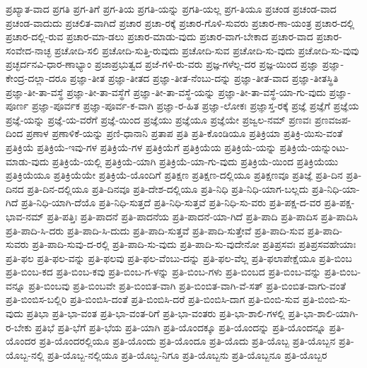 {ಪ್ರಖ್ಯಾತ-ವಾದ
ಪ್ರಗತಿ
ಪ್ರಗ-ತಿಗೆ
ಪ್ರಗ-ತಿಯ
ಪ್ರಗತಿ-ಯನ್ನು
ಪ್ರಗತಿ-ಯಲ್ಲ
ಪ್ರಗ-ತಿಯೂ
ಪ್ರಚಂಡ
ಪ್ರಚಂಡ-ವಾದ
ಪ್ರಚಂಡ-ವಾದುದು
ಪ್ರಚಲಿತ-ವಾಗಿದೆ
ಪ್ರಚಾರ
ಪ್ರಚಾ-ರಕ್ಕೆ
ಪ್ರಚಾರ-ಗೊಳಿ-ಸುವರು
ಪ್ರಚಾರ-ಣಾ-ಯಂತ್ರ
ಪ್ರಚಾರ-ದಲ್ಲಿ
ಪ್ರಚಾರ-ದಲ್ಲಿ-ರುವ
ಪ್ರಚಾರ-ಮಾ-ಡಲು
ಪ್ರಚಾರ-ಮಾಡು-ವುದು
ಪ್ರಚಾರ-ವಾಗ-ಬೇಕಾದ
ಪ್ರಚಾರ-ವಾದ
ಪ್ರಚಾರ-ಸಂವೇದ-ನಾಚ್ಛ
ಪ್ರಚೋದಿ-ಸಲಿ
ಪ್ರಚೋದಿ-ಸುತ್ತಿ-ರುವುದು
ಪ್ರಚೋದಿ-ಸುವ
ಪ್ರಚೋದಿ-ಸು-ವುದು
ಪ್ರಚೋದಿ-ಸು-ವುವು
ಪ್ರಚ್ಛರ್ದನವಿ-ಧಾರ-ಣಾಭ್ಯಾಂ
ಪ್ರಜಾಪ್ರಭುತ್ವದ
ಪ್ರಜೆ-ಗಳಿ-ರು-ವರು
ಪ್ರಜ್ಞ-ಗಳೆಲ್ಲ-ದರ
ಪ್ರಜ್ಞ-ಯಿಂದ
ಪ್ರಜ್ಞಾ
ಪ್ರಜ್ಞಾ-ಕೇಂದ್ರ-ದಲ್ಲಾ-ದರೂ
ಪ್ರಜ್ಞಾ-ತೀತ
ಪ್ರಜ್ಞಾ-ತೀತದ
ಪ್ರಜ್ಞಾ-ತೀತ-ನೆಂಬು-ದನ್ನು
ಪ್ರಜ್ಞಾ-ತೀತ-ವಾದ
ಪ್ರಜ್ಞಾ-ತೀತಸ್ಥಿತಿ
ಪ್ರಜ್ಞಾ-ತೀ-ತಾ-ವಸ್ಥೆ
ಪ್ರಜ್ಞಾ-ತೀ-ತಾ-ವಸ್ಥೆಗೆ
ಪ್ರಜ್ಞಾ-ತೀ-ತಾ-ವಸ್ಥೆ-ಯನ್ನು
ಪ್ರಜ್ಞಾ-ತೀ-ತಾ-ವಸ್ಥೆ-ಯಾ-ಗು-ವುದು
ಪ್ರಜ್ಞಾ-ಪೂರ್ಣ
ಪ್ರಜ್ಞಾ-ಪೂರ್ವಕ
ಪ್ರಜ್ಞಾ-ಪೂರ್ವ-ಕ-ವಾಗಿ
ಪ್ರಜ್ಞಾ-ರ-ಹಿತ
ಪ್ರಜ್ಞಾ-ಲೋಕಃ
ಪ್ರಜ್ಞಾಸ್ತ-ರಕ್ಕೆ
ಪ್ರಜ್ಞೆ
ಪ್ರಜ್ಞೆಗೆ
ಪ್ರಜ್ಞೆಯ
ಪ್ರಜ್ಞೆ-ಯನ್ನು
ಪ್ರಜ್ಞೆ-ಯ-ವರೆಗೆ
ಪ್ರಜ್ಞೆ-ಯಿಂದ
ಪ್ರಜ್ಞೆಯು
ಪ್ರಜ್ಞೆಯೂ
ಪ್ರಜ್ಞೆಯೇ
ಪ್ರಜ್ವಲ-ನಮ್
ಪ್ರಣವಃ
ಪ್ರಣವಜಪ-ದಿಂದ
ಪ್ರಣಾಳ
ಪ್ರಣಾಳಿಕೆ-ಯನ್ನು
ಪ್ರಣಿ-ಧಾನಾನಿ
ಪ್ರತಾಪ
ಪ್ರತಿ
ಪ್ರತಿ-ಕೊಂಡಿಯೂ
ಪ್ರತಿಕ್ರಿಯಾ
ಪ್ರತಿಕ್ರಿ-ಯಿಸು-ವಂತೆ
ಪ್ರತಿಕ್ರಿಯೆ
ಪ್ರತಿಕ್ರಿಯೆ-ಇವು-ಗಳ
ಪ್ರತಿಕ್ರಿಯೆ-ಗಳ
ಪ್ರತಿಕ್ರಿಯೆಗೆ
ಪ್ರತಿಕ್ರಿಯೆಯ
ಪ್ರತಿಕ್ರಿಯೆ-ಯನ್ನು
ಪ್ರತಿಕ್ರಿಯೆ-ಯನ್ನುಂಟು-ಮಾಡು-ವುದು
ಪ್ರತಿಕ್ರಿಯೆ-ಯಲ್ಲಿ
ಪ್ರತಿಕ್ರಿಯೆ-ಯಾಗಿ
ಪ್ರತಿಕ್ರಿಯೆ-ಯಾ-ಗು-ವುದು
ಪ್ರತಿಕ್ರಿಯೆ-ಯಿಂದ
ಪ್ರತಿಕ್ರಿಯೆಯು
ಪ್ರತಿಕ್ರಿಯೆಯೂ
ಪ್ರತಿಕ್ರಿಯೆಯೇ
ಪ್ರತಿಕ್ರಿಯೆ-ಯೊಂದಿಗೆ
ಪ್ರತಿಕ್ಷಣ
ಪ್ರತಿಕ್ಷಣ-ದಲ್ಲಿಯೂ
ಪ್ರತಿಕ್ಷಣವೂ
ಪ್ರತಿಜ್ಞೆ
ಪ್ರತಿ-ದಿನ
ಪ್ರತಿ-ದಿನದ
ಪ್ರತಿ-ದಿನ-ದಲ್ಲಿಯೂ
ಪ್ರತಿ-ದಿನವೂ
ಪ್ರತಿ-ದೇಶ-ದಲ್ಲಿಯೂ
ಪ್ರತಿ-ನಿಧಿ
ಪ್ರತಿ-ನಿಧಿ-ಯಾಗ-ಬಲ್ಲದು
ಪ್ರತಿ-ನಿಧಿ-ಯಾ-ಗಿದೆ
ಪ್ರತಿ-ನಿಧಿ-ಯಾಗಿ-ದೆಯೊ
ಪ್ರತಿ-ನಿಧಿ-ಸುತ್ತದೆ
ಪ್ರತಿ-ನಿಧಿ-ಸುತ್ತವೆ
ಪ್ರತಿ-ನಿಧಿ-ಸು-ವರು
ಪ್ರತಿ-ಪಕ್ಷ-ದ-ವರ
ಪ್ರತಿ-ಪಕ್ಷ-ಭಾವ-ನಮ್
ಪ್ರತಿ-ಪತ್ತಿಃ
ಪ್ರತಿ-ಪಾದನೆ
ಪ್ರತಿ-ಪಾದನೆಯ
ಪ್ರತಿ-ಪಾದನೆ-ಯಾ-ಗಿದೆ
ಪ್ರತಿ-ಪಾದಿ
ಪ್ರತಿ-ಪಾದಿಸ
ಪ್ರತಿ-ಪಾದಿಸಿ
ಪ್ರತಿ-ಪಾದಿ-ಸಿ-ದರು
ಪ್ರತಿ-ಪಾದಿ-ಸಿ-ದುದು
ಪ್ರತಿ-ಪಾದಿ-ಸುತ್ತವೆ
ಪ್ರತಿ-ಪಾದಿ-ಸುತ್ತೇವೆ
ಪ್ರತಿ-ಪಾದಿ-ಸುವ
ಪ್ರತಿ-ಪಾದಿ-ಸುವರು
ಪ್ರತಿ-ಪಾದಿ-ಸುವು-ದ-ರಲ್ಲಿ
ಪ್ರತಿ-ಪಾದಿ-ಸು-ವುದು
ಪ್ರತಿ-ಪಾದಿ-ಸು-ವುದೇನೋ
ಪ್ರತಿಪ್ರಸವಃ
ಪ್ರತಿಪ್ರಸವಹೇಯಾಃ
ಪ್ರತಿ-ಫಲ
ಪ್ರತಿ-ಫಲ-ವನ್ನು
ಪ್ರತಿ-ಫಲವು
ಪ್ರತಿ-ಫಲ-ವೆಂಬು-ದನ್ನು
ಪ್ರತಿ-ಫಲ-ವೆಲ್ಲ
ಪ್ರತಿ-ಫಲಾಪೇಕ್ಷೆಯೂ
ಪ್ರತಿ-ಬಿಂಬ
ಪ್ರತಿ-ಬಿಂಬ-ಕದ
ಪ್ರತಿ-ಬಿಂಬ-ಕವು
ಪ್ರತಿ-ಬಿಂಬ-ಗ-ಳನ್ನು
ಪ್ರತಿ-ಬಿಂಬ-ಗಳು
ಪ್ರತಿ-ಬಿಂಬದ
ಪ್ರತಿ-ಬಿಂಬ-ವನ್ನು
ಪ್ರತಿ-ಬಿಂಬ-ವನ್ನೂ
ಪ್ರತಿ-ಬಿಂಬವು
ಪ್ರತಿ-ಬಿಂಬವೇ
ಪ್ರತಿ-ಬಿಂಬಿತ-ವಾಗಿ
ಪ್ರತಿ-ಬಿಂಬಿತ-ವಾಗಿ-ವೆ-ಸತ್
ಪ್ರತಿ-ಬಿಂಬಿತ-ವಾಗು-ವಂತೆ
ಪ್ರತಿ-ಬಿಂಬಿಸ-ಬಲ್ಲಿರಿ
ಪ್ರತಿ-ಬಿಂಬಿಸಿ-ದಂತೆ
ಪ್ರತಿ-ಬಿಂಬಿಸಿ-ದರೆ
ಪ್ರತಿ-ಬಿಂಬಿಸಿ-ದಾಗ
ಪ್ರತಿ-ಬಿಂಬಿ-ಸುವ
ಪ್ರತಿ-ಬಿಂಬಿ-ಸು-ವುದು
ಪ್ರತಿಭಾ
ಪ್ರತಿ-ಭಾ-ವಂತ
ಪ್ರತಿ-ಭಾ-ವಂತ-ರಿಗೆ
ಪ್ರತಿ-ಭಾ-ವಂತರು
ಪ್ರತಿ-ಭಾ-ಶಾಲಿ-ಗಳಲ್ಲಿ
ಪ್ರತಿ-ಭಾ-ಶಾಲಿ-ಯಾಗಿ-ರ-ಬೇಕು
ಪ್ರತಿಭೆ
ಪ್ರತಿ-ಭೆಗೆ
ಪ್ರತಿ-ಭೆಯ
ಪ್ರತಿ-ಯಾಗಿ
ಪ್ರತಿ-ಯೊಂದಕ್ಕೂ
ಪ್ರತಿ-ಯೊಂದನ್ನು
ಪ್ರತಿ-ಯೊಂದನ್ನೂ
ಪ್ರತಿ-ಯೊಂದರ
ಪ್ರತಿ-ಯೊಂದರಲ್ಲಿಯೂ
ಪ್ರತಿ-ಯೊಂದು
ಪ್ರತಿ-ಯೊಂದೂ
ಪ್ರತಿ-ಯೊದು
ಪ್ರತಿ-ಯೊಬ್ಬ
ಪ್ರತಿ-ಯೊಬ್ಬನ
ಪ್ರತಿ-ಯೊಬ್ಬ-ನಲ್ಲಿ
ಪ್ರತಿ-ಯೊಬ್ಬ-ನಲ್ಲಿಯೂ
ಪ್ರತಿ-ಯೊಬ್ಬ-ನಿಗೂ
ಪ್ರತಿ-ಯೊಬ್ಬನು
ಪ್ರತಿ-ಯೊಬ್ಬನೂ
ಪ್ರತಿ-ಯೊಬ್ಬರ
}
